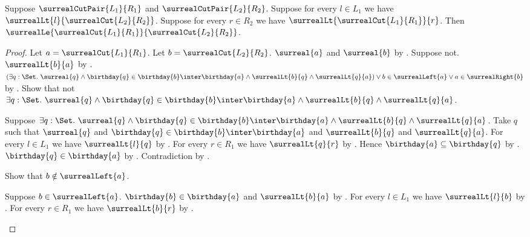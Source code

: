 \begin{theorem}\label{surreal_cut_le}
    Suppose $\surrealCutPair{L_1}{R_1}$ and
        $\surrealCutPair{L_2}{R_2}$.
    Suppose for every $l\in L_1$ we have
        $\surrealLt{l}{\surrealCut{L_2}{R_2}}$.
    Suppose for every $r\in R_2$ we have
        $\surrealLt{\surrealCut{L_1}{R_1}}{r}$.
    Then $\surrealLe{\surrealCut{L_1}{R_1}}
        {\surrealCut{L_2}{R_2}}$.
\end{theorem}
\begin{proof}
    Let $a=\surrealCut{L_1}{R_1}$.
    Let $b=\surrealCut{L_2}{R_2}$.
    $\surreal{a}$ and $\surreal{b}$
        by .
    Suppose not.
    $\surrealLt{b}{a}$
        by .
    $(\exists q:\Set.\ \surreal{q}\land
            \birthday{q}\in\birthday{b}\inter\birthday{a}\land
            \surrealLt{b}{q}\land\surrealLt{q}{a})
        \lor b\in\surrealLeft{a}
        \lor a\in\surrealRight{b}$
        by .
    Show that not $\exists q:\Set.\ \surreal{q}\land
            \birthday{q}\in\birthday{b}\inter\birthday{a}\land
            \surrealLt{b}{q}\land\surrealLt{q}{a}$.
    \begin{subproof}
        Suppose $\exists q:\Set.\ \surreal{q}\land
            \birthday{q}\in\birthday{b}\inter\birthday{a}\land
            \surrealLt{b}{q}\land\surrealLt{q}{a}$.
        Take $q$ such that $\surreal{q}$ and
            $\birthday{q}\in\birthday{b}\inter\birthday{a}$ and
            $\surrealLt{b}{q}$ and $\surrealLt{q}{a}$.
        For every $l\in L_1$ we have $\surrealLt{l}{q}$
            by .
        For every $r\in R_1$ we have $\surrealLt{q}{r}$
            by .
        Hence $\birthday{a}\subseteq\birthday{q}$
            by .
        $\birthday{q}\in\birthday{a}$ by .
        Contradiction by .
    \end{subproof}
    Show that $b\notin\surrealLeft{a}$.
    \begin{subproof}
        Suppose $b\in\surrealLeft{a}$.
        $\birthday{b}\in\birthday{a}$ and $\surrealLt{b}{a}$
            by .
        For every $l\in L_1$ we have $\surrealLt{l}{b}$
            by \auto.
        For every $r\in R_1$ we have $\surrealLt{b}{r}$
            by .

\end{subproof}
\end{proof}
